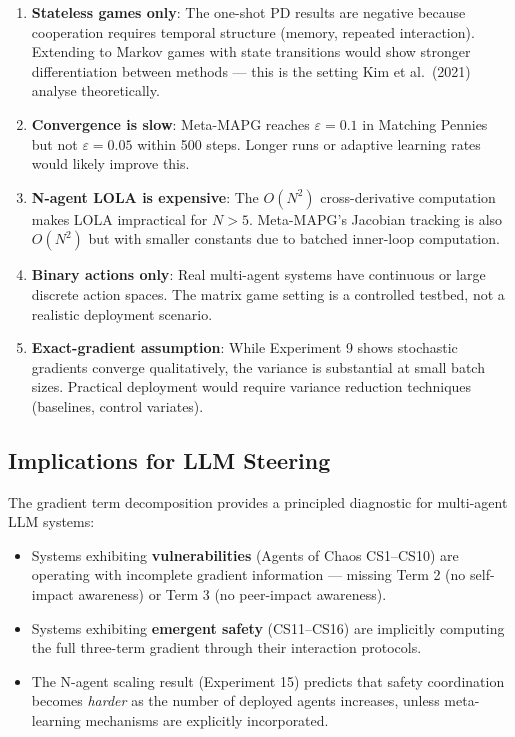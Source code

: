 \documentclass[11pt,a4paper]{article}
\begin{document}
\begin{enumerate}[nosep]
\item \textbf{Stateless games only}: The one-shot PD results are negative because cooperation requires temporal structure (memory, repeated interaction). Extending to Markov games with state transitions would show stronger differentiation between methods --- this is the setting Kim et al.\ (2021) analyse theoretically.

\item \textbf{Convergence is slow}: Meta-MAPG reaches $\varepsilon = 0.1$ in Matching Pennies but not $\varepsilon = 0.05$ within 500 steps. Longer runs or adaptive learning rates would likely improve this.

\item \textbf{N-agent LOLA is expensive}: The $O(N^2)$ cross-derivative computation makes LOLA impractical for $N > 5$. Meta-MAPG's Jacobian tracking is also $O(N^2)$ but with smaller constants due to batched inner-loop computation.

\item \textbf{Binary actions only}: Real multi-agent systems have continuous or large discrete action spaces. The matrix game setting is a controlled testbed, not a realistic deployment scenario.

\item \textbf{Exact-gradient assumption}: While Experiment 9 shows stochastic gradients converge qualitatively, the variance is substantial at small batch sizes. Practical deployment would require variance reduction techniques (baselines, control variates).
\end{enumerate}

\subsection{Implications for LLM Steering}

The gradient term decomposition provides a principled diagnostic for multi-agent LLM systems:
\begin{itemize}[nosep]
\item Systems exhibiting \textbf{vulnerabilities} (Agents of Chaos CS1--CS10) are operating with incomplete gradient information --- missing Term 2 (no self-impact awareness) or Term 3 (no peer-impact awareness).
\item Systems exhibiting \textbf{emergent safety} (CS11--CS16) are implicitly computing the full three-term gradient through their interaction protocols.
\item The N-agent scaling result (Experiment 15) predicts that safety coordination becomes \emph{harder} as the number of deployed agents increases, unless meta-learning mechanisms are explicitly incorporated.
\end{itemize}
\end{document}
